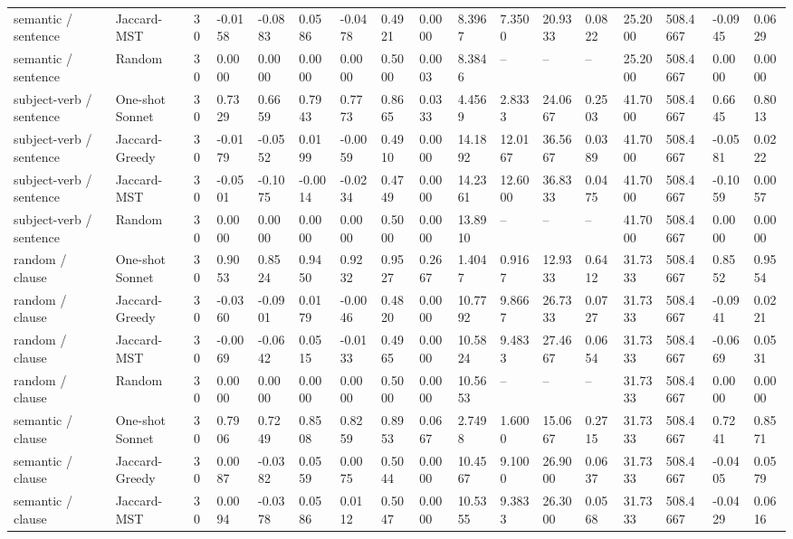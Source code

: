 \begin{table}[t]
{\begin{tabular}{lllllllllllllllll}
semantic / sentence & Jaccard-MST & 30 & -0.0158 & -0.0883 & 0.0586 & -0.0478 & 0.4921 & 0.0000 & 8.3967 & 7.3500 & 20.9333 & 0.0822 & 25.2000 & 508.4667 & -0.0945 & 0.0629 \\
semantic / sentence & Random & 30 & 0.0000 & 0.0000 & 0.0000 & 0.0000 & 0.5000 & 0.0003 & 8.3846 & -- & -- & -- & 25.2000 & 508.4667 & 0.0000 & 0.0000 \\
subject-verb / sentence & One-shot Sonnet & 30 & 0.7329 & 0.6659 & 0.7943 & 0.7773 & 0.8665 & 0.0333 & 4.4569 & 2.8333 & 24.0667 & 0.2503 & 41.7000 & 508.4667 & 0.6645 & 0.8013 \\
subject-verb / sentence & Jaccard-Greedy & 30 & -0.0179 & -0.0552 & 0.0199 & -0.0059 & 0.4910 & 0.0000 & 14.1892 & 12.0167 & 36.5667 & 0.0389 & 41.7000 & 508.4667 & -0.0581 & 0.0222 \\
subject-verb / sentence & Jaccard-MST & 30 & -0.0501 & -0.1075 & -0.0014 & -0.0234 & 0.4749 & 0.0000 & 14.2361 & 12.6000 & 36.8333 & 0.0475 & 41.7000 & 508.4667 & -0.1059 & 0.0057 \\
subject-verb / sentence & Random & 30 & 0.0000 & 0.0000 & 0.0000 & 0.0000 & 0.5000 & 0.0000 & 13.8910 & -- & -- & -- & 41.7000 & 508.4667 & 0.0000 & 0.0000 \\
random / clause & One-shot Sonnet & 30 & 0.9053 & 0.8524 & 0.9450 & 0.9232 & 0.9527 & 0.2667 & 1.4047 & 0.9167 & 12.9333 & 0.6412 & 31.7333 & 508.4667 & 0.8552 & 0.9554 \\
random / clause & Jaccard-Greedy & 30 & -0.0360 & -0.0901 & 0.0179 & -0.0046 & 0.4820 & 0.0000 & 10.7792 & 9.8667 & 26.7333 & 0.0727 & 31.7333 & 508.4667 & -0.0941 & 0.0221 \\
random / clause & Jaccard-MST & 30 & -0.0069 & -0.0642 & 0.0515 & -0.0133 & 0.4965 & 0.0000 & 10.5824 & 9.4833 & 27.4667 & 0.0654 & 31.7333 & 508.4667 & -0.0669 & 0.0531 \\
random / clause & Random & 30 & 0.0000 & 0.0000 & 0.0000 & 0.0000 & 0.5000 & 0.0000 & 10.5653 & -- & -- & -- & 31.7333 & 508.4667 & 0.0000 & 0.0000 \\
semantic / clause & One-shot Sonnet & 30 & 0.7906 & 0.7249 & 0.8508 & 0.8259 & 0.8953 & 0.0667 & 2.7498 & 1.6000 & 15.0667 & 0.2715 & 31.7333 & 508.4667 & 0.7241 & 0.8571 \\
semantic / clause & Jaccard-Greedy & 30 & 0.0087 & -0.0382 & 0.0559 & 0.0075 & 0.5044 & 0.0000 & 10.4567 & 9.1000 & 26.9000 & 0.0637 & 31.7333 & 508.4667 & -0.0405 & 0.0579 \\
semantic / clause & Jaccard-MST & 30 & 0.0094 & -0.0378 & 0.0586 & 0.0112 & 0.5047 & 0.0000 & 10.5355 & 9.3833 & 26.3000 & 0.0568 & 31.7333 & 508.4667 & -0.0429 & 0.0616 \\

\end{tabular}}
\end{table}
